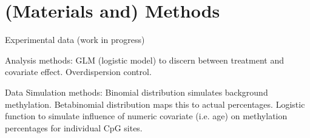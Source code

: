 \section{(Materials and) Methods}

Experimental data (work in progress)

Analysis methods: GLM (logistic model) to discern between treatment and covariate effect. 
Overdispersion control.

Data Simulation methods: Binomial distribution simulates background methylation. 
Betabinomial distribution maps this to actual percentages.
Logistic function to simulate influence of numeric covariate (i.e. age) on methylation percentages for individual CpG sites.